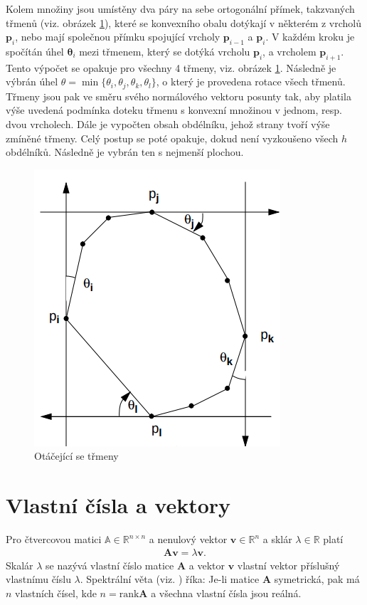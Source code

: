 \documentclass[twoside]{ctuthesis}
\newcommand{\minsp}[3]{$\mathbb{#1} \in \mathbb{#2}^{#3}$}
\newcommand{\tl}[1]{$\mathbf{#1}$}
\newcommand{\tli}[2]{$\mathbf{#1}_{#2}$}
\begin{document}
Kolem množiny jsou umístěny dva páry na sebe ortogonální přímek, takzvaných třmenů (viz. obrázek \ref{fig:rotating_calipers}), které se konvexního obalu dotýkají v některém z vrcholů $\mathbf{p}_i$, nebo mají společnou přímku spojující vrcholy \tli{p}{i-1} a \tli{p}{i}. V každém kroku je spočítán úhel \tli{\theta}{i} mezi třmenem, který se dotýká vrcholu \tli{p}{i}, a vrcholem \tli{p}{i+1}. Tento výpočet se opakuje pro všechny 4 třmeny, viz. obrázek \ref{fig:rotating_calipers}. Následně je výbrán úhel $\theta = \min \{ \theta_i, \theta_j, \theta_k, \theta_l \}$, o který je provedena rotace všech třmenů. Třmeny jsou pak ve směru svého normálového vektoru posunty tak, aby platila výše uvedená podmínka doteku třmenu s konvexní množinou v jednom, resp. dvou vrcholech. Dále je vypočten obsah obdélníku, jehož strany tvoří výše zmíněné třmeny. Celý postup se poté opakuje, dokud není vyzkoušeno všech $h$ obdélníků. Následně je vybrán ten s nejmenší plochou.

\begin{figure}
    \centering
    \includegraphics[width = 0.7 \linewidth]{pictures/rotating_calipers.png}
    \caption{Otáčející se třmeny}
    \label{fig:rotating_calipers}
\end{figure}

\section{Vlastní čísla a vektory}
Pro čtvercovou matici \minsp{A}{R}{n\times n} a nenulový vektor \tl{v}\minsp{}{R}{n} a sklár $\lambda \in \mathbb{R}$ platí
\begin{align}
    \mathbf{Av} = \lambda \mathbf{v}.
\end{align}
Skalár $\lambda$ se nazývá vlastní číslo matice \tl{A} a vektor \tl{v} vlastní vektor příslušný vlastnímu číslu $\lambda$.
Spektrální věta (viz. \cite{Werner2020}) říka: Je-li matice \tl{A} symetrická, pak má $n$ vlastních čísel, kde $n = \text{rank}\mathbf{A}$ a všechna vlastní čísla jsou reálná.
\end{document}
